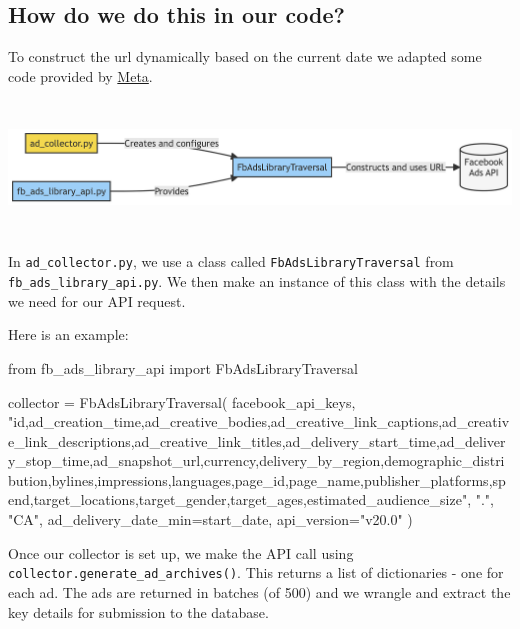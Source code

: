 \documentclass[
  letterpaper,
  DIV=11,
  numbers=noendperiod]{scrreprt}
\newenvironment{Shaded}{\begin{snugshade}}{\end{snugshade}}
\newcommand{\ImportTok}[1]{\textcolor[rgb]{0.00,0.46,0.62}{#1}}
\newcommand{\NormalTok}[1]{\textcolor[rgb]{0.00,0.23,0.31}{#1}}
\newcommand{\OperatorTok}[1]{\textcolor[rgb]{0.37,0.37,0.37}{#1}}
\newcommand{\StringTok}[1]{\textcolor[rgb]{0.13,0.47,0.30}{#1}}
\begin{document}
\subsection{How do we do this in our
code?}\label{how-do-we-do-this-in-our-code}

To construct the url dynamically based on the current date we adapted
some code provided by
\href{https://github.com/facebookresearch/Ad-Library-API-Script-Repository/tree/main}{Meta}.

\includegraphics[width=9.16in,height=1.39in]{collection_files/figure-latex/mermaid-figure-1.png}

In \texttt{ad\_collector.py}, we use a class called
\texttt{FbAdsLibraryTraversal} from \texttt{fb\_ads\_library\_api.py}.
We then make an instance of this class with the details we need for our
API request.

Here is an example:

\begin{Shaded}
\begin{Highlighting}[]
\ImportTok{from}\NormalTok{ fb\_ads\_library\_api }\ImportTok{import}\NormalTok{ FbAdsLibraryTraversal}

\NormalTok{collector }\OperatorTok{=}\NormalTok{ FbAdsLibraryTraversal(}
\NormalTok{        facebook\_api\_keys,}
        \StringTok{"id,ad\_creation\_time,ad\_creative\_bodies,ad\_creative\_link\_captions,ad\_creative\_link\_descriptions,ad\_creative\_link\_titles,ad\_delivery\_start\_time,ad\_delivery\_stop\_time,ad\_snapshot\_url,currency,delivery\_by\_region,demographic\_distribution,bylines,impressions,languages,page\_id,page\_name,publisher\_platforms,spend,target\_locations,target\_gender,target\_ages,estimated\_audience\_size"}\NormalTok{,}
        \StringTok{"."}\NormalTok{,}
        \StringTok{"CA"}\NormalTok{,}
\NormalTok{        ad\_delivery\_date\_min}\OperatorTok{=}\NormalTok{start\_date,}
\NormalTok{        api\_version}\OperatorTok{=}\StringTok{"v20.0"}
\NormalTok{    )}
\end{Highlighting}
\end{Shaded}

Once our collector is set up, we make the API call using
\texttt{collector.generate\_ad\_archives()}. This returns a list of
dictionaries - one for each ad. The ads are returned in batches (of 500)
and we wrangle and extract the key details for submission to the
database.
\end{document}

